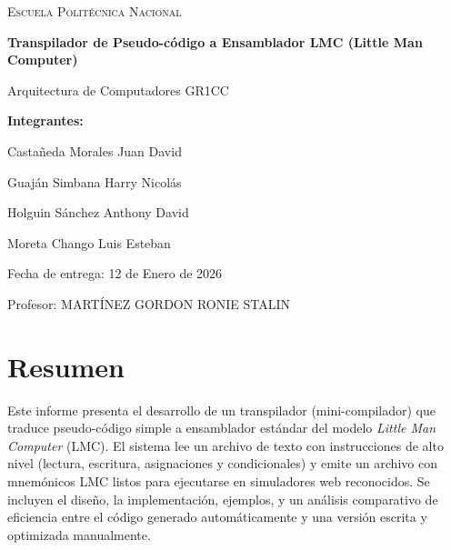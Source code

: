 \documentclass[12pt,a4paper]{article}
\begin{document}
\begin{titlepage}
  \centering
  \vspace*{2cm}
  {\scshape\LARGE Escuela Politécnica Nacional \par}
  \vspace{1.5cm}
  {\huge\bfseries Transpilador de Pseudo-código a Ensamblador LMC (Little Man Computer)\par}
  \vspace{1.0cm}
  {\Large Arquitectura de Computadores GR1CC \par}
  \vspace{2.0cm}

  {\large\bf Integrantes: \par}
  \vspace{0.4cm}
  {\large Castañeda Morales Juan David \par}
  \vspace{0.2cm}
  {\large Guaján Simbana Harry Nicolás \par}
  \vspace{0.2cm}
  {\large Holguin Sánchez Anthony David \par}
  \vspace{0.2cm}
  {\large Moreta Chango Luis Esteban \par}

  \vspace{2.0cm}
  {\large Fecha de entrega: 12 de Enero de 2026\par}

  \vfill
  {\small Profesor: MARTÍNEZ GORDON RONIE STALIN}
\end{titlepage}

\tableofcontents
\newpage

\section*{Resumen}
Este informe presenta el desarrollo de un transpilador (mini-compilador) que traduce pseudo-código simple a ensamblador estándar del modelo \emph{Little Man Computer} (LMC). El sistema lee un archivo de texto con instrucciones de alto nivel (lectura, escritura, asignaciones y condicionales) y emite un archivo con mnemónicos LMC listos para ejecutarse en simuladores web reconocidos. Se incluyen el diseño, la implementación, ejemplos, y un análisis comparativo de eficiencia entre el código generado automáticamente y una versión escrita y optimizada manualmente.
\end{document}
